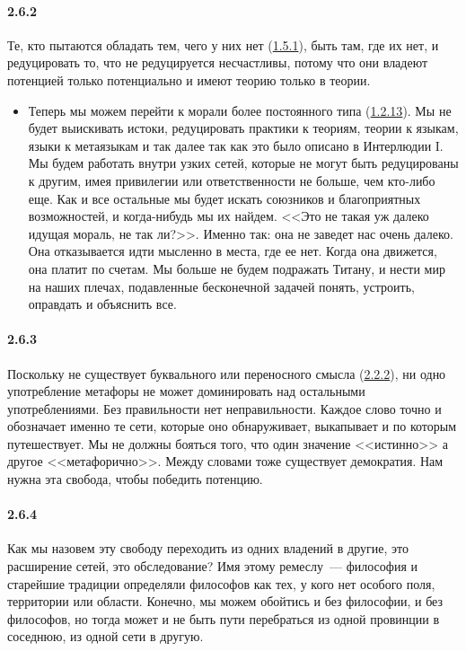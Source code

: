 \paragraph{2.6.2}\hypertarget{par:2.6.2}{} Те, кто пытаются обладать тем, чего у них нет (\hyperlink{par:1.5.1}{1.5.1}), быть там, где их нет, и редуцировать то, что не редуцируется несчастливы, потому что они владеют потенцией только потенциально и имеют теорию только в теории.
	\begin{itemize}
	\item 
	Теперь мы можем перейти к морали более постоянного типа (\hyperlink{par:1.2.13}{1.2.13}). Мы не будет выискивать истоки, редуцировать практики к теориям, теории к языкам, языки к метаязыкам и так далее так как это было описано в Интерлюдии I. Мы будем работать внутри узких сетей, которые не могут быть редуцированы к другим, имея привилегии или ответственности не больше, чем кто-либо еще. Как и все остальные мы будет искать союзников и благоприятных возможностей, и когда-нибудь мы их найдем. <<Это не такая уж далеко идущая мораль, не так ли?>>. Именно так: она не заведет нас очень далеко. Она отказывается идти мысленно в места, где ее нет. Когда она движется, она платит по счетам. Мы больше не будем подражать Титану, и нести мир на наших плечах, подавленные бесконечной задачей понять, устроить, оправдать и объяснить все.
	\end{itemize}

\paragraph{2.6.3}\hypertarget{par:2.6.3}{} Поскольку не существует буквального или переносного смысла (\hyperlink{par:2.2.2}{2.2.2}), ни одно употребление метафоры не может доминировать над остальными употреблениями. Без правильности нет неправильности. Каждое слово точно и обозначает именно те сети, которые оно обнаруживает, выкапывает и по которым путешествует. Мы не должны бояться того, что один значение <<истинно>> а другое <<метафорично>>. Между словами тоже существует демократия. Нам нужна эта свобода, чтобы победить потенцию.

\paragraph{2.6.4}\hypertarget{par:2.6.4}{} Как мы назовем эту свободу переходить из одних владений в другие, это расширение сетей, это обследование? Имя этому ремеслу~--- философия и старейшие традиции определяли философов как тех, у кого нет особого поля, территории или области. 
Конечно, мы можем обойтись и без философии, и без философов, но тогда может и не быть пути перебраться из одной провинции в соседнюю, из одной сети в другую.

